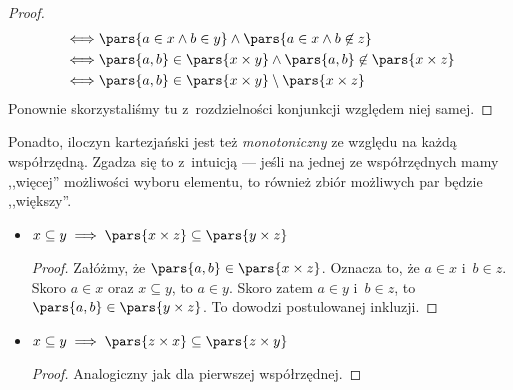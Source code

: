 \begin{itemize}
\begin{proof}
\begin{equation*}
\begin{split}
                        \iff& \pars{a \in x \land b \in y} \land \pars{a \in x \land b \not \in z}\\
                        \iff& \pars{a, b} \in \pars{x \times y} \land \pars{a, b} \not\in \pars{x \times z}\\
                        \iff& \pars{a, b} \in \pars{x \times y} \setminus \pars{x \times z}
                \end{split}
            \end{equation*}
            Ponownie skorzystaliśmy tu z~rozdzielności konjunkcji względem niej samej.
        \end{proof}
\end{itemize}
Ponadto, iloczyn kartezjański jest też \emph{monotoniczny} ze względu na każdą współrzędną. Zgadza się to z~intuicją --- jeśli na jednej ze współrzędnych mamy ,,więcej'' możliwości wyboru elementu, to również zbiór możliwych par będzie ,,większy''.
\begin{itemize}
    \item \(x \subseteq y \implies \pars{x \times z} \subseteq \pars{y \times z}\)
        \begin{proof}
            Załóżmy, że \(\pars{a, b} \in \pars{x \times z}\). Oznacza to, że \(a \in x\) i~\(b \in z\). Skoro \(a \in x\) oraz \(x \subseteq y\), to \(a \in y\). Skoro zatem \(a \in y\) i~\(b \in z\), to \(\pars{a, b} \in \pars{y \times z}\). To dowodzi postulowanej inkluzji.
        \end{proof}
    \item \(x \subseteq y \implies \pars{z \times x} \subseteq \pars{z \times y}\)
        \begin{proof}
            Analogiczny jak dla pierwszej współrzędnej.
        \end{proof}
\end{itemize}